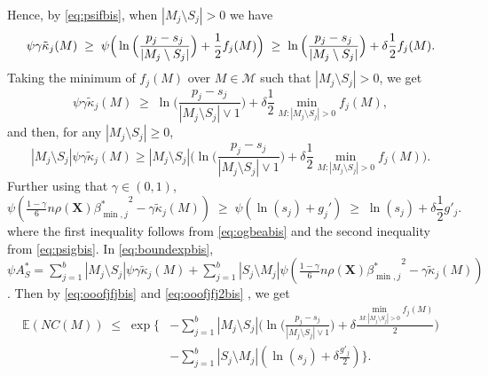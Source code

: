 \documentclass[bj,authoryear]{imsart}
\theoremstyle{plain}
\newcommand{\E}{\mathbb{E}}
\newcommand{\M}{\mathcal{M}}
\newcommand{\bs}{\boldsymbol}
\begin{document}
Hence, by \eqref{eq:psifbis}, when $|M_j\setminus S_j|>0$ we have
\begin{equation*}
\psi\gamma\tilde{\kappa}_j(M) \;\geq\; \psi\Big(\ln\Big(\frac{p_j-s_j}{|M_j\setminus S_j|}\Big)+ \frac12f_j(M)\Big)\\ \;\geq\; \ln\Big(\frac{p_j-s_j}{|M_j\setminus S_j|}\Big)+ \delta\frac12f_j(M).
\end{equation*}
Taking the minimum of $f_j(M)$ over $M\in \M$ such that $|M_j\setminus S_j|>0$, we get
\begin{equation*}
\psi\gamma\tilde{\kappa}_j(M) \;\geq\;  \ln\Big(\frac{p_j-s_j}{|M_j\setminus S_j|\vee 1}\Big)+ \delta\frac12 \min_{M: |M_j\setminus S_j|>0}f_j(M),
\end{equation*}
and then, for any $|M_j \setminus S_j| \geq 0$,
\begin{equation}\label{eq:ooofjfjbis}
    |M_j\setminus S_j|\psi\gamma\tilde{\kappa}_j(M) \geq |M_j\setminus S_j|\Big(\ln\Big(\frac{p_j-s_j}{|M_j\setminus S_j|\vee 1}\Big)+ \delta\frac12\min_{M: |M_j\setminus S_j|>0}f_j(M)\Big).
\end{equation}
Further using that $\gamma \in(0,1)$,
\begin{equation}\label{eq:ooofjfj2bis}
\psi\left(\tfrac{1-\gamma}{6} n \rho(\bs X) {\beta^*_{\min,j}}^{2} - \gamma\tilde{\kappa}_j(M)\right) \;\geq\; \psi\left(\ln(s_j)+g_j'\right) \;\geq\; \ln(s_j)+\delta \frac{1}{2}g'_j.
\end{equation}
where the first inequality follows from \eqref{eq:ogbeabis} and the second inequality from \eqref{eq:psigbis}. In \eqref{eq:boundexpbis}, $\psi A^*_S=\sum_{j=1}^b|M_j \setminus S_j|\psi\gamma\tilde{\kappa}_j(M) + \sum_{j=1}^b |S_j\setminus M_j |\psi\left(\tfrac{1-\gamma}{6} n \rho(\bs X) {\beta^*_{\min,j}}^{2} - \gamma\tilde{\kappa}_j(M)\right)$. Then by \eqref{eq:ooofjfjbis} and \eqref{eq:ooofjfj2bis} , we get
\begin{align}\label{eq:fyvbis}
\E(NC(M))\;\leq\;\exp  \Bigg\{ & - \sum_{j=1}^b |M_j\setminus S_j|\big(\ln\big(\tfrac{p_j-s_j}{|M_j\setminus S_j|\vee 1}\big)+\delta \tfrac{\min_{M: |M_j\setminus S_j|>0}f_j(M)}{2}\big) \\ & -\sum_{j=1}^b |S_j\setminus M_j|(\ln(s_j)+\delta \tfrac{g'_j}{2})\Bigg\}.    \nonumber
\end{align}
\end{document}
